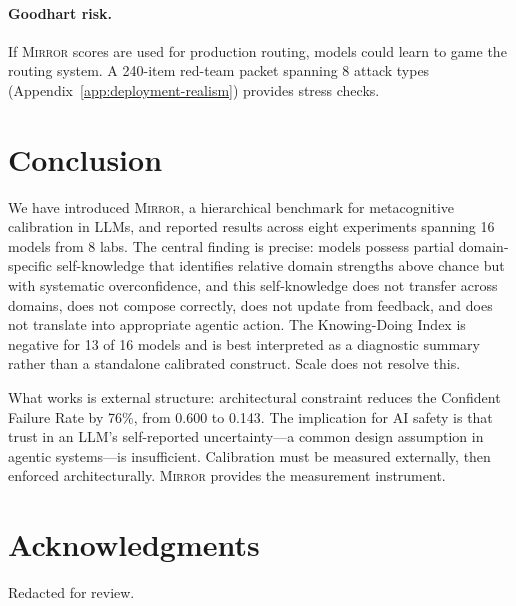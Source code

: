 \documentclass[10pt]{article}
\newcommand{\mirror}{\textsc{Mirror}}
\begin{document}
\paragraph{Goodhart risk.}
If \mirror{} scores are used for production routing, models could learn to game the routing system. A 240-item red-team packet spanning 8 attack types (Appendix~\ref{app:deployment-realism}) provides stress checks.

\vspace{-1mm}
\section{Conclusion}
\label{sec:conclusion}

We have introduced \mirror{}, a hierarchical benchmark for metacognitive
calibration in LLMs, and reported results across eight experiments spanning 16
models from 8 labs. The central finding is precise: models possess partial domain-specific
self-knowledge that identifies relative domain strengths above chance but with
systematic overconfidence, and this self-knowledge
does not transfer across domains, does not compose correctly, does not update from
feedback, and does not translate into appropriate agentic action. The Knowing-Doing
Index is negative for 13 of 16 models and is best interpreted as a diagnostic summary rather than a standalone calibrated construct. Scale does not resolve this.

What works is external structure: architectural constraint reduces the Confident
Failure Rate by 76\%, from 0.600 to 0.143. The implication for AI safety is that
trust in an LLM's self-reported uncertainty---a common design assumption in agentic
systems---is insufficient. Calibration must be measured externally, then enforced
architecturally. \mirror{} provides the measurement instrument.

\section*{Acknowledgments}

Redacted for review.

\FloatBarrier



\end{document}
